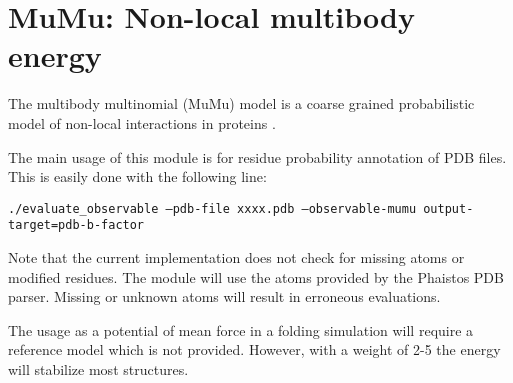 \section{MuMu: Non-local multibody energy}
The multibody multinomial (MuMu) model is a coarse grained probabilistic model of non-local interactions in proteins \cite{johansson2013mumu}. 

The main usage of this module is for residue probability annotation of PDB files. This is easily done with the following line:
\begin{flushleft}
\texttt{./evaluate\_observable --pdb-file xxxx.pdb --observable-mumu output-target=pdb-b-factor}
\end{flushleft}
Note that the current implementation does not check for missing atoms or modified residues. The module will use the atoms provided by the Phaistos PDB parser. Missing or unknown atoms will result in erroneous evaluations.

The usage as a potential of mean force in a folding simulation will require a reference model which is not provided. However, with a weight of 2-5 the energy will stabilize most structures.

\begin{optiontable}
\end{optiontable}
